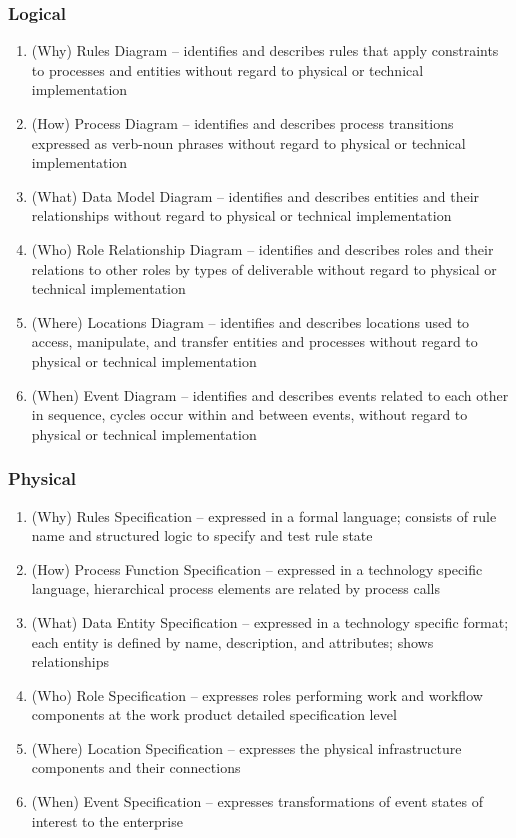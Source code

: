 \documentclass[12pt,a4paper,final,twoside,onecolumn,titlepage]{book}
\begin{document}
\subsubsection{Logical}
\begin{enumerate}
\item (Why) Rules Diagram – identifies and describes rules that apply constraints to processes and entities without regard to physical or technical implementation
\item (How) Process Diagram – identifies and describes process transitions expressed as verb-noun phrases without regard to physical or technical implementation
\item (What) Data Model Diagram – identifies and describes entities and their relationships without regard to physical or technical implementation
\item (Who) Role Relationship Diagram – identifies and describes roles and their relations to other roles by types of deliverable without regard to physical or technical implementation
\item (Where) Locations Diagram – identifies and describes locations used to access, manipulate, and transfer entities and processes without regard to physical or technical implementation
\item (When) Event Diagram – identifies and describes events related to each other in sequence, cycles occur within and between events, without regard to physical or technical implementation
\end{enumerate}
\subsubsection{Physical}
\begin{enumerate}
\item (Why) Rules Specification – expressed in a formal language; consists of rule name and structured logic to specify and test rule state
\item (How) Process Function Specification – expressed in a technology specific language, hierarchical process elements are related by process calls
\item (What) Data Entity Specification – expressed in a technology specific format; each entity is defined by name, description, and attributes; shows relationships
\item (Who) Role Specification – expresses roles performing work and workflow components at the work product detailed specification level
\item (Where) Location Specification – expresses the physical infrastructure components and their connections
\item (When) Event Specification – expresses transformations of event states of interest to the enterprise
\end{enumerate}
\end{document}

